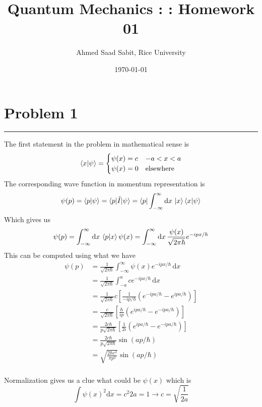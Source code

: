 \documentclass[letter, 10pts]{article}
\title{Quantum Mechanics : : Homework 01}
\author{Ahmed Saad Sabit, Rice University}
\date{\today}
\newcommand{\hb}{\hbar}
\begin{document}
\maketitle

\section*{Problem 1} 
\hrule 
The first statement in the problem in mathematical sense is 
\[
\braket{x | \psi} = 
\begin{cases} 
	\psi(x) = c  & - a < x  < a \\  
	\psi(x) = 0 & \text{elsewhere} 
\end{cases}
\] 
The corresponding wave function in momentum representation is 
\[
\psi(p) = \braket{p | \psi}
=
\braket{p | \hat{I} | \psi} 
= \bra{p}  
\int_{-\infty}^{\infty}  \mathrm{d} x \,   
\ket{x} \braket{x | \psi}
\] 
Which gives us 
\[
\psi(p) = \int_{-\infty}^{\infty} 
\mathrm{d} x \, 
\braket{p | x} \psi(x) 
=
\int_{-\infty}^{\infty} 
\mathrm{d} x \, 
\frac{\psi(x)}{\sqrt{2 \pi \hb} } e^{ - i p x / \hb}
\]
This can be computed using what we have 
\begin{align*}
	\psi(p) &= \frac{1}{\sqrt {2 \pi \hb} } 
\int_{-\infty}^{\infty} \psi(x) e^{ - i p x / \hb} \, \mathrm{d} x \\ 
&= \frac{1}{\sqrt{2 \pi \hb} } \int_{-a}^{a}  c e^{ - i p x / \hb } \, \mathrm{d} x  \\ 
&= \frac{1}{\sqrt{2 \pi \hb} } c 
\left[
\frac{1}{- i p / \hb} (e^{- i p a / \hb} - e^{i p a / \hb})	
\right]\\
&= \frac{c}{\sqrt{2 \pi \hb} } 
\left[
\frac{\hb}{i p } (e^{ i p a / \hb} - e^{- i p a / \hb})	
\right]\\
&= \frac{2c \hb}{p \sqrt{2 \pi \hb} } 
\left[
\frac{1}{2i } (e^{ i p a / \hb} - e^{- i p a / \hb})	
\right]\\
&= \frac{2c \hb}{p \sqrt{2 \pi \hb} } 
\sin(a p / \hb ) \\
&= 
\sqrt{\frac{2\hb c^2}{\pi p^2}} 
\sin(a p / \hb ) \\
\end{align*}

Normalization gives us a clue what could be $\psi(x)$ which is 
\[
\int \psi(x)^2 \mathrm{d} x = c^2 2 a = 1 \to  c = \sqrt{\frac{1}{2 a}} 
\] 
\end{document}
